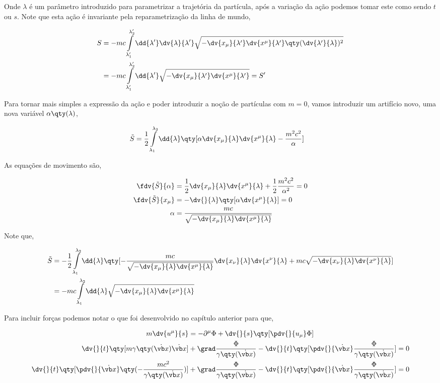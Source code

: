 \documentclass[twoside]{amsart}
\numberwithin{equation}{section}
\begin{document}
Onde $\lambda$ é um parâmetro introduzido para parametrizar a trajetória da partícula, após a variação da ação podemos tomar este como sendo $t$ ou $s$. Note que esta ação é invariante pela reparametrização da linha de mundo,

\begin{align}
    S&=-mc\int\limits_{\lambda_1'}^{\lambda_2'}\dd{\lambda'}\dv{\lambda}{\lambda'}\sqrt{-\dv{x_\mu}{\lambda'}\dv{x^\mu}{\lambda'}\qty(\dv{\lambda'}{\lambda})^2}\\
    &=-mc\int\limits_{\lambda_1'}^{\lambda_2'}\dd{\lambda'}\sqrt{-\dv{x_\mu}{\lambda'}\dv{x^\mu}{\lambda'}}=S'
\end{align}

Para tornar mais simples a expressão da ação e poder introduzir a noção de partículas com $m=0$, vamos introduzir um artifício novo, uma nova variável $\alpha\qty(\lambda)$,

\begin{align}
    \tilde S&=\frac12\int\limits_{\lambda_1}^{\lambda_2}\dd{\lambda}\qty[\alpha\dv{x_\mu}{\lambda}\dv{x^\mu}{\lambda}-\frac{m^2c^2}{\alpha}]
\end{align}

As equações de movimento são,

\begin{align}
    \fdv{\tilde S}{\alpha}&=\frac12\dv{x_\mu}{\lambda}\dv{x^\mu}{\lambda}+\frac12 \frac{m^2c^2}{\alpha^2}=0\\
    \fdv{\tilde S}{x_\mu}&=-\dv{}{\lambda}\qty[\alpha\dv{x^\mu}{\lambda}]=0\\
    \alpha&=\frac{mc}{\sqrt{-\dv{x_\mu}{\lambda}\dv{x^\mu}{\lambda}}}
\end{align}

Note que,

\begin{align}
    \tilde S&=-\frac12\int\limits_{\lambda_1}^{\lambda_2}\dd{\lambda}\qty[-\frac{mc}{\sqrt{-\dv{x_\mu}{\lambda}\dv{x^\mu}{\lambda}}}\dv{x_\nu}{\lambda}\dv{x^\nu}{\lambda}+mc\sqrt{-\dv{x_\nu}{\lambda}\dv{x^\nu}{\lambda}}]\\
    &=-mc\int\limits_{\lambda_1}^{\lambda_2}\dd{\lambda}\sqrt{-\dv{x_\mu}{\lambda}\dv{x^\mu}{\lambda}}
\end{align}

Para incluir forças podemos notar o que foi desenvolvido no capítulo anterior para que,

\begin{align}
    m\dv{u^\mu}{s}&=-\partial^\mu\Phi+\dv{}{s}\qty[\pdv{}{u_\mu}\Phi]\\
    \dv{}{t}\qty[m\gamma\qty(\dot{\vb x})\dot{\vb x}]&+\grad\frac{\Phi}{\gamma\qty(\dot{\vb x})}-\dv{}{t}\qty[\pdv{}{\dot{\vb x}}\frac{\Phi}{\gamma\qty(\dot{\vb x})}]=0\\
    \dv{}{t}\qty[\pdv{}{\dot{\vb x}}\qty(-\frac{mc^2}{\gamma\qty(\dot{\vb x})})]&+\grad\frac{\Phi}{\gamma\qty(\dot{\vb x})}-\dv{}{t}\qty[\pdv{}{\dot{\vb x}}\frac{\Phi}{\gamma\qty(\dot{\vb x})}]=0
\end{align}
\end{document}
